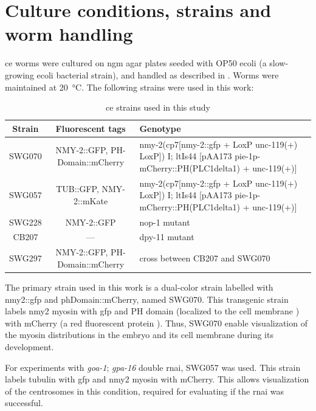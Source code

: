\section{Culture conditions, strains and worm handling}\label{sec:wormHandling}
\acs{ce} worms were cultured on \ac{ngm} agar plates seeded with OP50 \ac{ecoli} (a slow-growing \ac{ecoli} bacterial strain), and handled as described in \cite{brenner1974genetics}. Worms were maintained at \SI{20}{\celsius}. The following strains were used in this work:

\begin{table}[h!]
    \centering
    \begin{tabular}{| c | c | m{} |} 
        \hline
        Strain & Fluorescent tags & \hfil Genotype \\
        \hline
        SWG070 & NMY-2::GFP, PH-Domain::mCherry & nmy-2(cp7[nmy-2::gfp + LoxP unc-119(+) LoxP]) I; ltIs44 [pAA173 pie-1p-mCherry::PH(PLC1delta1) + unc-119(+)]\\[3em]
        SWG057 & TUB::GFP, NMY-2::mKate & nmy-2(cp7[nmy-2::gfp + LoxP unc-119(+) LoxP]) I; ltIs44 [pAA173 pie-1p-mCherry::PH(PLC1delta1) + unc-119(+)]\\[3em]
        SWG228 & NMY-2::GFP & nop-1 mutant\\[3em]
        CB207 & --- & dpy-11 mutant\\[3em]
        SWG297 & NMY-2::GFP, PH-Domain::mCherry & cross between CB207 and SWG070\\
        \hline
    \end{tabular}
    \caption{\ac{ce} strains used in this study}
    \label{tab:ceStrains}
\end{table}

The primary strain used in this work is a dual-color strain labelled with \acs{nmy2}::\acs{gfp} and phDomain::mCherry, named SWG070. This transgenic strain labels \ac{nmy2} myosin with \acf{gfp} and PH domain (localized to the cell membrane \citep{park2008comprehensive}) with mCherry (a red fluorescent protein \citep{shaner2004improved}). Thus, SWG070 enable visualization of the myosin distributions in the embryo and its cell membrane during its development.

For experiments with \textit{goa-1}; \textit{gpa-16} double \ac{rnai}, SWG057 was used. This strain labels tubulin with \ac{gfp} and \ac{nmy2} myosin with mCherry. This allows visualization of the centrosomes in this condition, required for evaluating if the \ac{rnai} was successful. 

